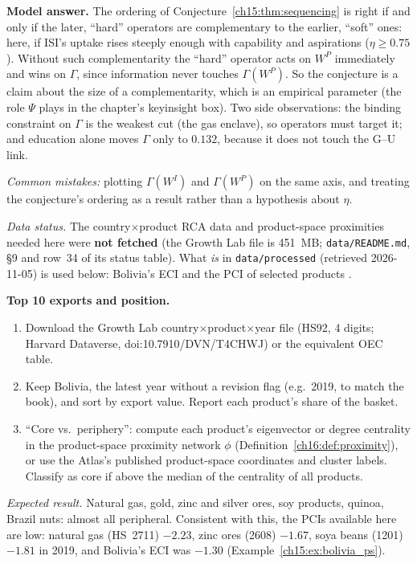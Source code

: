 \documentclass[../solutions_manual.tex]{subfiles}
\begin{document}
\textbf{Model answer.} The ordering of Conjecture~\ref{ch15:thm:sequencing} is right if and only if the later, ``hard'' operators are complementary to the earlier, ``soft'' ones: here, if ISI's uptake rises steeply enough with capability and aspirations ($\eta \ge 0.75$). Without such complementarity the ``hard'' operator acts on $W^P$ immediately and wins on $\Gamma$, since information never touches $\Gamma(W^P)$. So the conjecture is a claim about the size of a complementarity, which is an empirical parameter (the role $\Psi$ plays in the chapter's keyinsight box). Two side observations: the binding constraint on $\Gamma$ is the weakest cut (the gas enclave), so operators must target it; and education alone moves $\Gamma$ only to $0.132$, because it does not touch the G--U link.

\emph{Common mistakes:} plotting $\Gamma(W^I)$ and $\Gamma(W^P)$ on the same axis, and treating the conjecture's ordering as a result rather than a hypothesis about $\eta$.


\emph{Data status.} The country$\times$product RCA data and product-space proximities needed here were \textbf{not fetched} (the Growth Lab file is 451~MB; \nolinkurl{data/README.md}, \S9 and row~34 of its status table). What \emph{is} in \nolinkurl{data/processed} (retrieved 2026-11-05) is used below: Bolivia's ECI and the PCI of selected products \citep{growthlab2026atlas}.

 \textbf{Top 10 exports and position.}
\begin{enumerate}
\item Download the Growth Lab country$\times$product$\times$year file (HS92, 4 digits; Harvard Dataverse, doi:10.7910/DVN/T4CHWJ) or the equivalent OEC table.
\item Keep Bolivia, the latest year without a revision flag (e.g.\ 2019, to match the book), and sort by export value. Report each product's share of the basket.
\item ``Core vs.\ periphery'': compute each product's eigenvector or degree centrality in the product-space proximity network $\phi$ (Definition~\ref{ch16:def:proximity}), or use the Atlas's published product-space coordinates and cluster labels. Classify as core if above the median of the centrality of all products.
\end{enumerate}
\emph{Expected result.} Natural gas, gold, zinc and silver ores, soy products, quinoa, Brazil nuts: almost all peripheral. Consistent with this, the PCIs available here are low: natural gas (HS~2711) $-2.23$, zinc ores (2608) $-1.67$, soya beans (1201) $-1.81$ in 2019, and Bolivia's ECI was $-1.30$ (Example~\ref{ch15:ex:bolivia_ps}).
\end{document}
